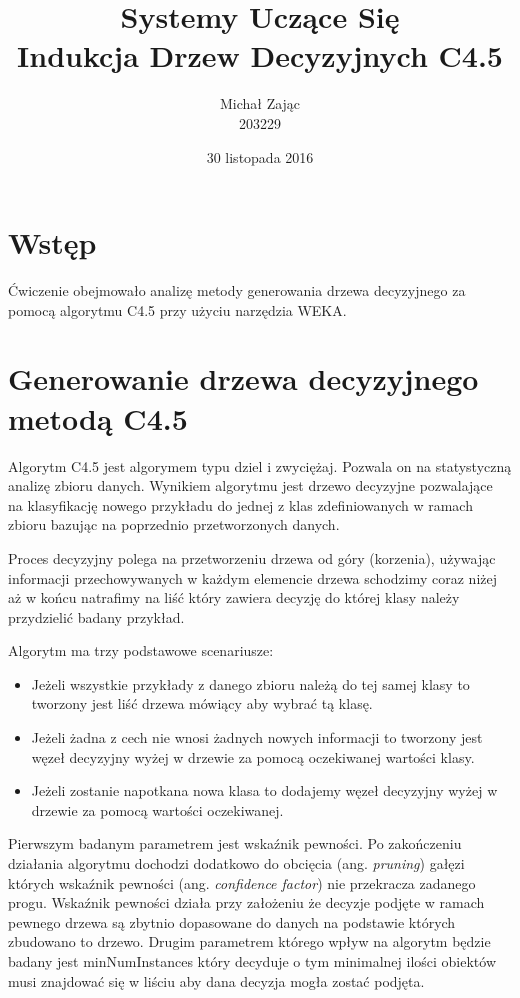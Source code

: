 \documentclass{article}
\title{Systemy Uczące Się \\ Indukcja Drzew Decyzyjnych C4.5}
\author{Michał Zając \\ 203229}
\date{30 listopada 2016}
\begin{document}
\maketitle
\clearpage
\section{Wstęp}
Ćwiczenie obejmowało analizę metody generowania drzewa decyzyjnego za pomocą algorytmu C4.5 przy użyciu narzędzia WEKA.

\section{Generowanie drzewa decyzyjnego metodą C4.5}
Algorytm C4.5 jest algorymem typu dziel i zwyciężaj. Pozwala on na statystyczną analizę zbioru danych. Wynikiem algorytmu jest drzewo decyzyjne pozwalające na klasyfikację nowego przykładu do jednej z klas zdefiniowanych w ramach zbioru bazując na poprzednio przetworzonych danych.

Proces decyzyjny polega na przetworzeniu drzewa od góry (korzenia), używając informacji przechowywanych w każdym elemencie drzewa schodzimy coraz niżej aż w końcu natrafimy na liść który zawiera decyzję do której klasy należy przydzielić badany przykład.

Algorytm ma trzy podstawowe scenariusze:

\begin{itemize}
  \item Jeżeli wszystkie przykłady z danego zbioru należą do tej samej klasy to tworzony jest liść drzewa mówiący aby wybrać tą klasę.
  \item Jeżeli żadna z cech nie wnosi żadnych nowych informacji to tworzony jest węzeł decyzyjny wyżej w drzewie za pomocą oczekiwanej wartości klasy.
  \item Jeżeli zostanie napotkana nowa klasa to dodajemy węzeł decyzyjny wyżej w drzewie za pomocą wartości oczekiwanej.
\end{itemize}

Pierwszym badanym parametrem jest wskaźnik pewności. Po zakończeniu działania algorytmu dochodzi dodatkowo do obcięcia (ang. \textit{pruning}) gałęzi których wskaźnik pewności (ang. \textit{confidence factor}) nie przekracza zadanego progu. Wskaźnik pewności działa przy założeniu że decyzje podjęte w ramach pewnego drzewa są zbytnio dopasowane do danych na podstawie których zbudowano to drzewo.
Drugim parametrem którego wpływ na algorytm będzie badany jest minNumInstances który decyduje o tym minimalnej ilości obiektów musi znajdować się w liściu aby dana decyzja mogła zostać podjęta.
\end{document}
